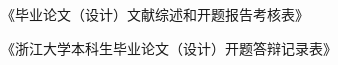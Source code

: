 
\cleardoublepage{}
\tableofcontents
{\raggedright{}\heiti
《毕业论文（设计）文献综述和开题报告考核表》

《浙江大学本科生毕业论文（设计）开题答辩记录表》
}
\clearpage
